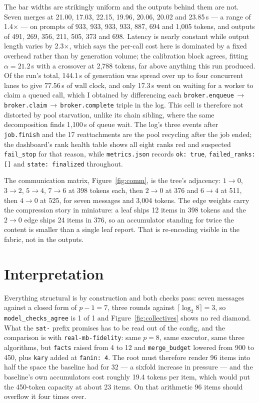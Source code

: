 \documentclass[11pt]{article}
\begin{document}
The bar widths are strikingly uniform and the outputs behind them are not. Seven merges at
21.00, 17.03, 22.15, 19.96, 20.06, 20.02 and 23.85\,s --- a range of 1.4$\times$ --- on
prompts of 933, 933, 933, 933, 887, 694 and 1{,}005 tokens, and outputs of 491, 269, 356,
211, 505, 373 and 698. Latency is nearly constant while output length varies by
2.3$\times$, which says the per-call cost here is dominated by a fixed overhead rather than
by generation volume; the calibration block agrees, fitting $\alpha = 21.2$\,s with a
crossover at 2{,}788 tokens, far above anything this run produced. Of the run's total,
144.1\,s of generation was spread over up to four concurrent lanes to give 77.56\,s of wall
clock, and only 17.3\,s went on waiting for a worker to claim a queued call, which I
obtained by differencing each
\texttt{broker.enqueue}\,$\to$\,\texttt{broker.claim}\,$\to$\,\texttt{broker.complete}
triple in the log. This cell is therefore not distorted by pool starvation, unlike its
chain sibling, where the same decomposition finds 1{,}100\,s of queue wait. The log's three
events after \texttt{job.finish} and the 17 reattachments are the pool recycling after the
job ended; the dashboard's rank health table shows all eight ranks red and suspected
\texttt{fail\_stop} for that reason, while \texttt{metrics.json} records \texttt{ok: true},
\texttt{failed\_ranks: []} and \texttt{state: finalized} throughout.

The communication matrix, Figure~\ref{fig:comm}, is the tree's adjacency: $1\!\to\!0$,
$3\!\to\!2$, $5\!\to\!4$, $7\!\to\!6$ at 398 tokens each, then $2\!\to\!0$ at 376 and
$6\!\to\!4$ at 511, then $4\!\to\!0$ at 525, for seven messages and 3{,}004 tokens. The
edge weights carry the compression story in miniature: a leaf ships 12 items in 398 tokens
and the $2\!\to\!0$ edge ships 24 items in 376, so an accumulator standing for twice the
content is smaller than a single leaf report. That is re-encoding visible in the fabric,
not in the outputs.

\section{Interpretation}

Everything structural is by construction and both checks pass: seven messages against a
closed form of $p-1=7$, three rounds against $\lceil\log_2 8\rceil=3$, so
\texttt{model\_checks\_agree} is 1 of 1 and Figure~\ref{fig:collectives} shows no red
diamond. What the \texttt{sat-} prefix promises has to be read out of the config, and the
comparison is with \texttt{real-mb-fidelity}: same $p=8$, same executor, same three
algorithms, but \texttt{facts} raised from 4 to 12 and \texttt{merge\_budget} lowered from
900 to 450, plus \texttt{kary} added at \texttt{fanin: 4}. The root must therefore render
96 items into half the space the baseline had for 32 --- a sixfold increase in pressure ---
and the baseline's own accumulators cost roughly 19.4 tokens per item, which would put the
450-token capacity at about 23 items. On that arithmetic 96 items should overflow it four
times over.
\end{document}
